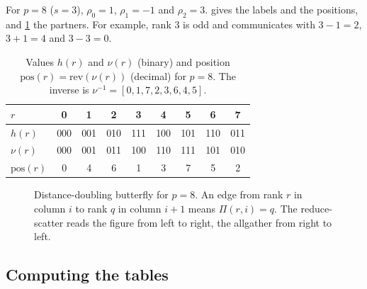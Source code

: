 For $p=8$ ($s=3$), $\rho_0=1$, $\rho_1=-1$ and $\rho_2=3$.
 gives the labels and the positions, and \cref{fig:bfly-butterfly} the partners.
For example, rank $3$ is odd and communicates with $3-1=2$, $3+1=4$ and $3-3=0$.

\begin{table}[t]
\centering
\small
\caption{Values $h(r)$ and $\nu(r)$ (binary) and position $\mathrm{pos}(r)=\mathrm{rev}(\nu(r))$ (decimal) for $p=8$. The inverse is $\nu^{-1}=[0,1,7,2,3,6,4,5]$.}
\label{tab:bfly-nu-p8}
\begin{tabular}{@{}l*{8}{c}@{}}
\toprule
$r$ & 0 & 1 & 2 & 3 & 4 & 5 & 6 & 7 \\
\midrule
$h(r)$ & 000 & 001 & 010 & 111 & 100 & 101 & 110 & 011 \\
$\nu(r)$ & 000 & 001 & 011 & 100 & 110 & 111 & 101 & 010 \\
$\mathrm{pos}(r)$ & 0 & 4 & 6 & 1 & 3 & 7 & 5 & 2 \\
\bottomrule
\end{tabular}
\end{table}

\begin{figure}[t]
\centering
{}
\caption{Distance-doubling \bine{} butterfly for $p=8$. An edge from rank $r$ in column $i$ to rank $q$ in column $i+1$ means $\Pi(r,i)=q$. The reduce-scatter reads the figure from left to right, the allgather from right to left.}
\label{fig:bfly-butterfly}
\end{figure}

\subsection{Computing the tables}

